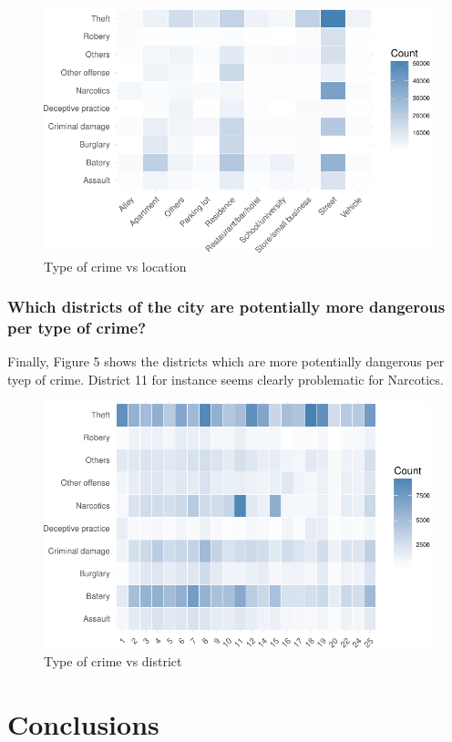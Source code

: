\documentclass[]{article}
\begin{document}
\begin{figure}[H]

{\centering \includegraphics{Assessment_1v10_files/figure-latex/fig11-1} 

}

\caption{Type of crime vs location}\label{fig:fig11}
\end{figure}

\subsubsection{Which districts of the city are potentially more
dangerous per type of
crime?}\label{which-districts-of-the-city-are-potentially-more-dangerous-per-type-of-crime}

Finally, Figure 5 shows the districts which are more potentially
dangerous per tyep of crime. District 11 for instance seems clearly
problematic for Narcotics.

\begin{figure}[H]

{\centering \includegraphics{Assessment_1v10_files/figure-latex/fig10-1} 

}

\caption{Type of crime vs district}\label{fig:fig10}
\end{figure}

\section{Conclusions}\label{conclusions}
\end{document}
